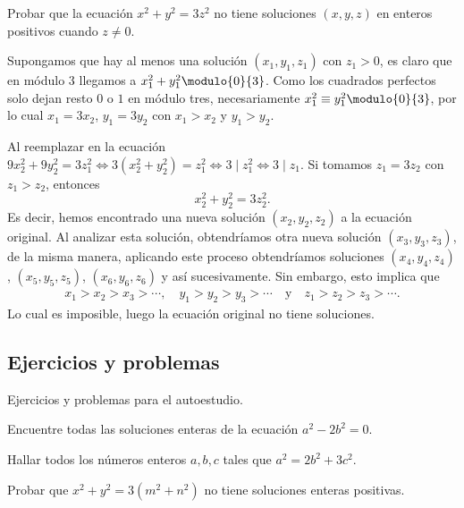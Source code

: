 \begin{example}
    Probar que la ecuación $x^2 + y^2 = 3z^2$ no tiene soluciones $(x,y,z)$ en enteros positivos cuando $z \neq 0$.
\end{example}
\begin{solution}
    Supongamos que hay al menos una solución $(x_1,y_1,z_1)$ con $z_1 > 0$, es claro que en módulo 3 llegamos a $x_1^2+y_1^2 \modulo{0}{3}$.
    Como los cuadrados perfectos solo dejan resto $0$ o $1$ en módulo tres, necesariamente $x_1^2\equiv y_1^2 \modulo{0}{3}$,
    por lo cual $x_1 = 3x_2$, $y_1 = 3y_2$ con $x_1 > x_2$ y $y_1 > y_2$.

    Al reemplazar en la ecuación $9x_2^2+9y_2^2=3z_1^2 \iff 3(x_2^2+y_2^2)=z_1^2 \iff 3 \mid z_1^2 \iff 3 \mid z_1$.
    Si tomamos $z_1 = 3z_2$ con $z_1 > z_2$, entonces
    \[
        x_2^2+y_2^2=3z_2^2.
    \]
    Es decir, hemos encontrado una nueva solución $(x_2,y_2,z_2)$ a la ecuación original.
    Al analizar esta solución, obtendríamos otra nueva solución $(x_3,y_3,z_3)$, de la misma manera, aplicando este proceso
    obtendríamos soluciones $(x_4,y_4,z_4)$, $(x_5,y_5,z_5)$, $(x_6,y_6,z_6)$ y así sucesivamente.
    Sin embargo, esto implica que
    \begin{align*}
        x_1 > x_2 > x_3 > \cdots, \quad
        y_1 > y_2 > y_3 > \cdots \quad \text{y} \quad
        z_1 > z_2 > z_3 > \cdots.
    \end{align*}
    Lo cual es imposible, luego la ecuación original no tiene soluciones.
\end{solution}




\subsection{Ejercicios y problemas}

Ejercicios y problemas para el autoestudio.

\begin{exercise}
    Encuentre todas las soluciones enteras de la ecuación $a^2 - 2b^2 = 0$.
\end{exercise}

\begin{exercise}
    Hallar todos los números enteros $a,b,c$ tales que $a^2 = 2b^2 + 3c^2$.
\end{exercise}

\begin{exercise}
    Probar que $x^2 + y^2 = 3(m^2 + n^2)$ no tiene soluciones enteras positivas.
\end{exercise}

